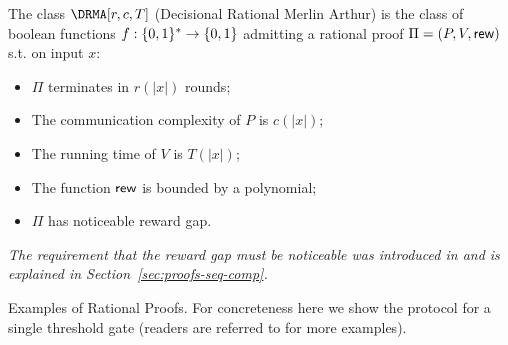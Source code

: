 

\begin{definition}
The class $\DRMA[r, c, T]$ (Decisional Rational Merlin Arthur)
is the class of boolean functions $f : \{0, 1\}^{*} \to \{0, 1\}$ admitting a rational proof $\Pi = (P,V, \mathsf{rew})$ s.t. on input $x$:
\begin{itemize}
    \item $\Pi$ terminates in $r(|x|)$ rounds;
    \item The communication complexity of $P$ is $c(|x|)$;
    \item The running time of $V$ is $T(|x|)$;
    \item The function $\mathsf{rew}$ is bounded by a polynomial;
    \item $\Pi$ has noticeable reward gap.
\end{itemize}
\end{definition}

\noindent
\begin{remark}
\label{rem:asy}
{\em The requirement that the reward gap must be noticeable was introduced in 
\cite{am1,ratargs} and is explained in Section~\ref{sec:proofs-seq-comp}.}
\end{remark}

\label{sec:example}
\smallskip
\noindent
{\sc Examples of Rational Proofs.} For concreteness here we show the protocol for a single threshold gate (readers are referred to \cite{am,am1,rosen} for more examples). 

